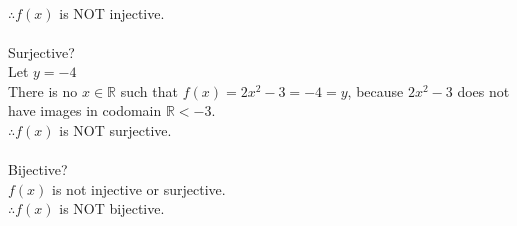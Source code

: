 \documentclass{article}
\begin{document}
\begin{enumerate}
\begin{enumerate}
{\begin{align*}
\end{align*}
$\therefore f(x)$ is NOT injective.
\\\\Surjective?
\\Let $y=-4$
\\There is no $x\in\mathbb{R}$ such that $f(x)=2x^2-3=-4=y$, because $2x^2-3$ does not have images in codomain $\mathbb{R}<-3$.
\\$\therefore f(x)$ is NOT surjective.
\\\\Bijective?
\\$f(x)$ is not injective or surjective.
\\$\therefore f(x)$ is NOT bijective.
}\\
\end{enumerate}

\newpage


\end{enumerate}
\end{document}
